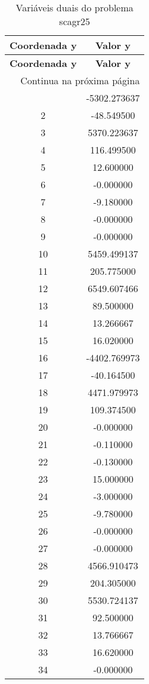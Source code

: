 \documentclass[12pt]{article}
\begin{document}
\begin{longtable}{@{}cc@{}}
\caption{Variáveis duais do problema scagr25} \\
\toprule
\textbf{Coordenada y} & \textbf{Valor y} \\
\midrule
\endfirsthead

\toprule
\textbf{Coordenada y} & \textbf{Valor y} \\
\midrule
\endhead

\midrule \multicolumn{2}{r}{{Continua na próxima página}} \\ \midrule
\endfoot

\bottomrule
\endlastfoot
1 & -5302.273637 \\
2 & -48.549500 \\
3 & 5370.223637 \\
4 & 116.499500 \\
5 & 12.600000 \\
6 & -0.000000 \\
7 & -9.180000 \\
8 & -0.000000 \\
9 & -0.000000 \\
10 & 5459.499137 \\
11 & 205.775000 \\
12 & 6549.607466 \\
13 & 89.500000 \\
14 & 13.266667 \\
15 & 16.020000 \\
16 & -4402.769973 \\
17 & -40.164500 \\
18 & 4471.979973 \\
19 & 109.374500 \\
20 & -0.000000 \\
21 & -0.110000 \\
22 & -0.130000 \\
23 & 15.000000 \\
24 & -3.000000 \\
25 & -9.780000 \\
26 & -0.000000 \\
27 & -0.000000 \\
28 & 4566.910473 \\
29 & 204.305000 \\
30 & 5530.724137 \\
31 & 92.500000 \\
32 & 13.766667 \\
33 & 16.620000 \\
34 & -0.000000 \\

\end{longtable}
\end{document}
